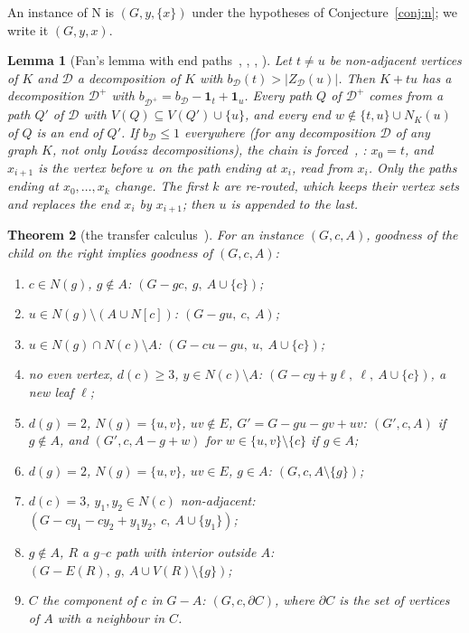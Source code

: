 \documentclass[11pt]{amsart}
\newtheorem{theorem}{Theorem}[section]
\newtheorem{lemma}[theorem]{Lemma}
\theoremstyle{definition}
\newcommand{\cD}{\mathcal D}
\begin{document}
An instance of N is $(G,y,\{x\})$ under the hypotheses of Conjecture~\ref{conj:n}; we write it
$(G,y,x)$.

\begin{lemma}[Fan's lemma with end paths~{\cite{Fan05}, \cite[Lemma~2.2]{RD}, \cite[Thm.~5.1]{CLT}, \cite[Lemma~2.1]{DL}}]\label{lem:fan}
Let $t\ne u$ be non-adjacent vertices of $K$ and $\cD$ a decomposition of $K$ with
$b_\cD(t)>|Z_\cD(u)|$. Then $K+tu$ has a decomposition $\cD^+$ with
$b_{\cD^+}=b_\cD-\mathbf 1_t+\mathbf 1_u$. Every path $Q$ of $\cD^+$ comes from a path $Q'$ of $\cD$
with $V(Q)\subseteq V(Q')\cup\{u\}$, and every end $w\notin\{t,u\}\cup N_K(u)$ of $Q$ is an end of
$Q'$. If $b_\cD\le1$ everywhere (for any decomposition $\cD$ of any graph $K$, not only Lov\'asz
decompositions), the chain is \emph{forced}~\cite[Prop.~2.1]{TF}, \cite[Lemma~2.2]{RD}: $x_0=t$,
and $x_{i+1}$ is the vertex before $u$ on the path ending at $x_i$, read from $x_i$. Only the paths ending at $x_0,\dots,x_k$ change. The
first $k$ are re-routed, which keeps their vertex sets and replaces the end $x_i$ by $x_{i+1}$; then
$u$ is appended to the last.
\end{lemma}

\begin{theorem}[the transfer calculus~{\cite[Thm.~3.1]{L1I}}]\label{thm:calc}
For an instance $(G,c,A)$, goodness of the child on the right implies goodness of $(G,c,A)$:
\begin{enumerate}[label=(\alph*)]
\item $c\in N(g)$, $g\notin A$: $(G-gc,\ g,\ A\cup\{c\})$;
\item $u\in N(g)\setminus(A\cup N[c])$: $(G-gu,\ c,\ A)$;
\item $u\in N(g)\cap N(c)\setminus A$: $(G-cu-gu,\ u,\ A\cup\{c\})$;
\item no even vertex, $d(c)\ge3$, $y\in N(c)\setminus A$: $(G-cy+y\ell,\ \ell,\ A\cup\{c\})$, a new leaf $\ell$;
\item $d(g)=2$, $N(g)=\{u,v\}$, $uv\notin E$, $G'=G-gu-gv+uv$: $(G',c,A)$ if $g\notin A$, and
$(G',c,A-g+w)$ for $w\in\{u,v\}\setminus\{c\}$ if $g\in A$;
\item $d(g)=2$, $N(g)=\{u,v\}$, $uv\in E$, $g\in A$: $(G,c,A\setminus\{g\})$;
\item $d(c)=3$, $y_1,y_2\in N(c)$ non-adjacent: $(G-cy_1-cy_2+y_1y_2,\ c,\ A\cup\{y_1\})$;
\item $g\notin A$, $R$ a $g$--$c$ path with interior outside $A$: $(G-E(R),\ g,\ A\cup V(R)\setminus\{g\})$;
\item $C$ the component of $c$ in $G-A$: $(G,c,\partial C)$, where $\partial C$ is the set of
vertices of $A$ with a neighbour in $C$.
\end{enumerate}
\end{theorem}
\end{document}

